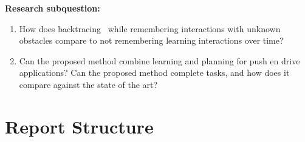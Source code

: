 \textbf{Research subquestion:}
\begin{enumerate}
    \item\label{researchsubquestion:does_it_work} How does backtracing~\cite{krontiris_dealing_2015} while remembering interactions with unknown obstacles compare to not remembering learning interactions over time?
    \item\label{researchsubquestion:does_it_compare} Can the proposed method combine learning and planning for push en drive applications? Can the proposed method complete tasks, and how does it compare against the state of the art? 
\end{enumerate}


\section{Report Structure}


